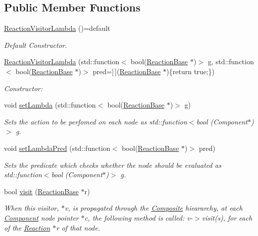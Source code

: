 \subsection*{Public Member Functions}
\begin{DoxyCompactItemize}
\item 
\hyperlink{classReactionVisitorLambda_ad36a99954e16f1ca538459271a0f429f}{Reaction\+Visitor\+Lambda} ()=default
\begin{DoxyCompactList}\small\item\em Default Constructor. \end{DoxyCompactList}\item 
\hyperlink{classReactionVisitorLambda_ad41ac087aa7c2e2daa85604893a28a56}{Reaction\+Visitor\+Lambda} (std\+::function$<$ bool(\hyperlink{classReactionBase}{Reaction\+Base} $\ast$)$>$ g, std\+::function$<$ bool(\hyperlink{classReactionBase}{Reaction\+Base} $\ast$)$>$ pred=\mbox{[}$\,$\mbox{]}(\hyperlink{classReactionBase}{Reaction\+Base} $\ast$)\{return true;\})
\begin{DoxyCompactList}\small\item\em Constructor\+: \end{DoxyCompactList}\item 
void \hyperlink{classReactionVisitorLambda_ade8528f4fbc1d980e043df2787dfe317}{set\+Lambda} (std\+::function$<$ bool(\hyperlink{classReactionBase}{Reaction\+Base} $\ast$)$>$ g)
\begin{DoxyCompactList}\small\item\em Sets the action to be perfomed on each node as std\+::function$<$bool (\+Component$\ast$)$>$ g. \end{DoxyCompactList}\item 
void \hyperlink{classReactionVisitorLambda_acadd3371a2546c5b9a13974db708877a}{set\+Lambda\+Pred} (std\+::function$<$ bool(\hyperlink{classReactionBase}{Reaction\+Base} $\ast$)$>$ pred)
\begin{DoxyCompactList}\small\item\em Sets the predicate which checks whether the node should be evaluated as std\+::function$<$bool (\+Component$\ast$)$>$ g. \end{DoxyCompactList}\item 
bool \hyperlink{classReactionVisitor_a2a2381f0f0fcd0067537af8d965a32d3}{visit} (\hyperlink{classReactionBase}{Reaction\+Base} $\ast$r)
\begin{DoxyCompactList}\small\item\em When this visitor, $\ast$v, is propagated through the \hyperlink{classComposite}{Composite} hieararchy, at each \hyperlink{classComponent}{Component} node pointer $\ast$c, the following method is called\+: v-\/$>$visit(s), for each of the \hyperlink{classReaction}{Reaction} $\ast$r of that node. \end{DoxyCompactList}\end{DoxyCompactItemize}
